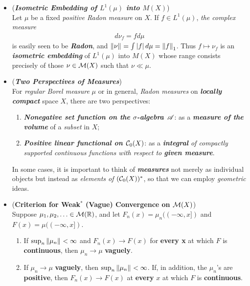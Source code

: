 \documentclass[11pt]{article}
\begin{document}
\begin{itemize}
\item \begin{remark} (\emph{\textbf{Isometric Embedding of $L^1(\mu)$ into $M(X)$}})\\
Let $\mu$ be a fixed \emph{positive Radon measure} on $X$. If $f \in L^1(\mu)$, \emph{the complex measure}
\begin{align*}
d\nu_f = f d\mu 
\end{align*}
is easily seen to be \emph{\textbf{Radon}}, and $\left\|\nu\right\|_{} = \int \left\lvert f \right\rvert d\mu = \left\|f\right\|_{1}$.
Thus $f \mapsto \nu_f$ is an \emph{\textbf{isometric embedding}} of $L^1(\mu)$ into $M(X)$ whose range consists precisely of those $\nu \in {\mathcal M}(X)$ such that $\nu \ll \mu$. 
\end{remark}

\item \begin{remark} (\emph{\textbf{Two Perspectives of Measures}})\\
For \emph{regular Borel measure} $\mu$ or in general, \emph{Radon measures} on \emph{\textbf{locally compact}} space $X$, there are two perspectives:
\begin{enumerate}
\item \emph{\textbf{Nonegative set function on the $\sigma$-algebra ${\mathscr A}$}}: as a \emph{\textbf{measure of the volume}} of a \emph{subset} in $X$;
\item \emph{\textbf{Positive linear functional on ${\mathcal C}_0(X)$}}: as a \emph{\textbf{integral} of compactly supported continuous functions with respect to \textbf{given measure}}.
\end{enumerate}
In some cases, it is important to think of \emph{\textbf{measures}} not merely as individual  objects but instead as \emph{elements of $({\mathcal C}_{0}(X))^{*}$}, so that we can employ \emph{geometric} ideas. 
\end{remark}

\item \begin{proposition} (\textbf{Criterion for Weak$^{*}$ (Vague) Convergence on ${\mathcal M}(X)$}) \citep{folland2013real}\\
Suppose $\mu_1, \mu_2, \ldots \in {\mathcal M}({\mathbb R})$, and let $F_{n}(x) = \mu_n((-\infty, x])$ and $F(x) = \mu((-\infty, x])$.
\begin{enumerate}
\item  If $\sup_n\left\|\mu_n\right\|_{} < \infty$ and $F_n(x) \rightarrow F(x)$ for \textbf{every x} at which $F$ is \textbf{continuous},
then $\mu_n \rightarrow \mu$ \textbf{vaguely}.
\item If $\mu_n \rightarrow \mu$ \textbf{vaguely}, then $\sup_n\left\|\mu_n\right\|_{} < \infty$. If, in addition, the $\mu_n$’s are \textbf{positive},
then $F_n(x) \rightarrow F(x)$ at \textbf{every} $x$ at which $F$ is \textbf{continuous}.
\end{enumerate}
\end{proposition}


\end{itemize}
\end{document}
